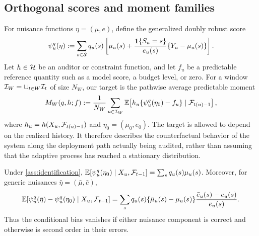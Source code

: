 \subsection{Orthogonal scores and moment families}
For nuisance functions $\eta=(\mu,e)$, define the generalized doubly robust score
\begin{equation}
\psi_u^q(\eta)
:=\sum_{s\in\mathcal{S}}q_u(s)
\left[
\mu_u(s)+\frac{\mathbf{1}\{S_u=s\}}{e_u(s)}\{Y_u-\mu_u(s)\}
\right].
\label{eq:orthogonal-score}
\end{equation}
Let $h\in\mathcal{H}$ be an auditor or constraint function, and let $f_u$ be a predictable reference quantity such as a model score, a budget level, or zero. For a window $\mathcal{I}_W=\cup_{t\in W}\mathcal{I}_t$ of size $N_W$, our target is the pathwise average predictable moment
\begin{equation}
M_W(q,h;f)
:=\frac{1}{N_W}\sum_{u\in\mathcal{I}_W}
\mathbb{E}\!\left[h_u\{\psi_u^q(\eta_0)-f_u\}\mid\mathcal{F}_{t(u)-1}\right],
\label{eq:target-moment}
\end{equation}
where $h_u=h(X_u,\mathcal{F}_{t(u)-1})$ and $\eta_0=(\mu_0,e_0)$. The target is allowed to depend on the realized history. It therefore describes the counterfactual behavior of the system along the deployment path actually being audited, rather than assuming that the adaptive process has reached a stationary distribution.

\begin{proposition}
\label{prop:dr}
Under \cref{ass:identification}, $\mathbb{E}[\psi_u^q(\eta_0)\mid X_u,\mathcal{F}_{t-1}]=\sum_s q_u(s)\mu_u(s)$. Moreover, for generic nuisances $\bar\eta=(\bar\mu,\bar e)$,
\begin{equation}
\mathbb{E}[\psi_u^q(\bar\eta)-\psi_u^q(\eta_0)\mid X_u,\mathcal{F}_{t-1}]
=\sum_s q_u(s)\{\bar\mu_u(s)-\mu_u(s)\}
\frac{\bar e_u(s)-e_u(s)}{\bar e_u(s)}.
\label{eq:dr-remainder}
\end{equation}
Thus the conditional bias vanishes if either nuisance component is correct and otherwise is second order in their errors.
\end{proposition}

